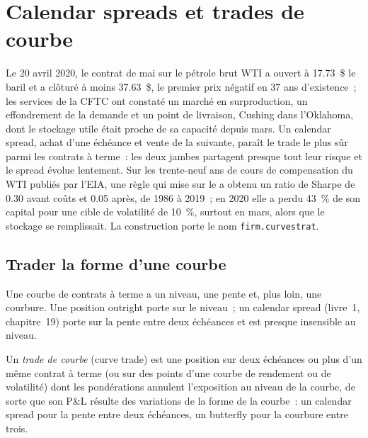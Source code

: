 \chapter{Calendar spreads et trades de courbe}\label{ch:s1:calendar-spreads-and-curve-trades}

Le 20 avril 2020, le contrat de mai sur le pétrole brut WTI a ouvert à 17.73~\$ le baril et a clôturé à moins 37.63~\$, le premier prix négatif en 37 ans d'existence~;
les services de la CFTC ont constaté un marché en surproduction, un effondrement de la demande et un point de livraison, Cushing dans l'Oklahoma, dont le stockage utile était proche de sa capacité
depuis mars. Un calendar spread, achat d'une échéance et vente de la suivante, paraît le trade le plus sûr parmi les contrats à terme~: les deux jambes partagent presque tout leur risque
et le spread évolue lentement. Sur les trente-neuf ans de cours de compensation du WTI publiés par l'EIA, une règle qui mise sur le  a obtenu un ratio de Sharpe de
0.30 avant coûts et 0.05 après, de 1986 à 2019~; en 2020 elle a perdu 43~\% de son capital pour une cible de volatilité de 10~\%, surtout en mars, alors que le stockage
se remplissait. La construction porte le nom \texttt{firm.curvestrat}.

\section{Trader la forme d'une courbe}

Une courbe de contrats à terme a un niveau, une pente et, plus loin, une courbure. Une position outright porte sur le niveau~; un calendar spread (livre~1, chapitre~19)
porte sur la pente entre deux échéances et est presque insensible au niveau.

\begin{definition}\label{def:s1:calendar-spreads-and-curve-trades:curve}
Un \emph{trade de courbe} (curve trade) est une position sur deux échéances ou plus d'un même contrat à terme (ou sur des points d'une courbe de rendement ou de volatilité)
dont les pondérations annulent l'exposition au niveau de la courbe, de sorte que son P\&L résulte des variations de la forme de la courbe~: un calendar spread pour la pente entre
deux échéances, un butterfly pour la courbure entre trois.
\end{definition}

